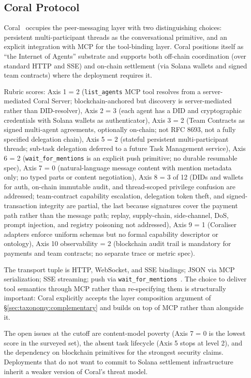 \subsection{Coral Protocol}
\label{sec:industry:coral}

Coral~\cite{spec_coral} occupies the peer-messaging layer
with two distinguishing choices: persistent multi-participant
threads as the conversational primitive, and an explicit
integration with MCP for the tool-binding layer. Coral
positions itself as ``the Internet of Agents'' substrate
and supports both off-chain coordination (over standard
HTTP and SSE) and on-chain settlement (via Solana wallets
and signed team contracts) where the deployment requires
it.

Rubric scores: Axis 1 = 2 (\texttt{list\_agents} MCP tool
resolves from a server-mediated Coral Server;
blockchain-anchored but discovery is server-mediated
rather than DID-resolver), Axis 2 = 3 (each agent has a
DID and cryptographic credentials with Solana wallets as
authenticator), Axis 3 = 2 (Team Contracts as signed
multi-agent agreements, optionally on-chain; not RFC 8693,
not a fully specified delegation chain), Axis 5 = 2
(stateful persistent multi-participant threads; sub-task
delegation deferred to a future Task Management service),
Axis 6 = 2 (\texttt{wait\_for\_mentions} is an explicit
push primitive; no durable resumable spec), Axis 7 = 0
(natural-language message content with mention metadata
only; no typed parts or content negotiation), Axis 8 = 3
of 12 (DIDs and wallets for auth, on-chain immutable
audit, and thread-scoped privilege confusion are
addressed; team-contract capability escalation,
delegation token theft, and signed-transaction integrity
are partial, the last because signatures cover the payment
path rather than the message path; replay, supply-chain,
side-channel, DoS, prompt injection, and registry
poisoning not addressed), Axis 9 = 1 (Coraliser adapters
enforce uniform schemas but no formal capability
descriptor or ontology), Axis 10 observability = 2
(blockchain audit trail is mandatory for payments and
team contracts; no separate trace or metric spec).

The transport tuple is HTTP, WebSocket, and SSE
bindings; JSON via MCP serialization; SSE streaming; push
via \texttt{wait\_for\_mentions}~\cite{spec_coral}. The
choice to deliver tool semantics through MCP rather than
re-specifying them is structurally important: Coral
explicitly accepts the layer composition argument of
\S\ref{sec:taxonomy:complementary} and builds on top of
MCP rather than alongside it.

The open issues at the cutoff are content-model
poverty (Axis 7 = 0 is the lowest score in the surveyed
set), the absent task lifecycle (Axis 5 stops at level 2),
and the dependency on blockchain primitives for the
strongest security claims. Deployments that do not want
to commit to Solana settlement infrastructure inherit a
weaker version of Coral's threat model.
